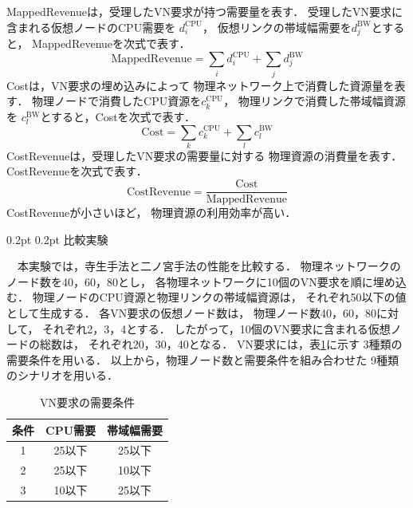 \documentclass[10pt,twocolumn]{jarticle}
\makeatletter
\renewcommand{\section}{\@startsection{section}{1}{\z@}%
{0.2pt}
{0.2pt}
  {\reset@font\Large\mcfamily}}
\makeatother
\begin{document}
MappedRevenueは，受理したVN要求が持つ需要量を表す．
受理したVN要求に含まれる仮想ノードのCPU需要を
$d^{\mathrm{CPU}}_i$，
仮想リンクの帯域幅需要を$d^{\mathrm{BW}}_j$とすると，
MappedRevenueを次式で表す．
\begin{equation}
  \mathrm{MappedRevenue}
  =
  \sum_i d_i^{\mathrm{CPU}}
  +
  \sum_j d_j^{\mathrm{BW}}
  \label{eq:mapped-revenue}
\end{equation}
Costは，VN要求の埋め込みによって
物理ネットワーク上で消費した資源量を表す．
物理ノードで消費したCPU資源を$c^{\mathrm{CPU}}_k$，
物理リンクで消費した帯域幅資源を
$c^{\mathrm{BW}}_l$とすると，Costを次式で表す．
\begin{equation}
  \mathrm{Cost}
  =
  \sum_k c_k^{\mathrm{CPU}}
  +
  \sum_l c_l^{\mathrm{BW}}
  \label{eq:cost}
\end{equation}
CostRevenueは，受理したVN要求の需要量に対する
物理資源の消費量を表す．
CostRevenueを次式で表す．
\begin{equation}
  \mathrm{CostRevenue}
  =
  \frac{\mathrm{Cost}}
       {\mathrm{MappedRevenue}}
  \label{eq:cost-revenue}
\end{equation}
CostRevenueが小さいほど，
物理資源の利用効率が高い．


\section{比較実験}

\noindent　本実験では，寺生手法と二ノ宮手法の性能を比較する．
物理ネットワークのノード数を40，60，80とし，
各物理ネットワークに10個のVN要求を順に埋め込む．
物理ノードのCPU資源と物理リンクの帯域幅資源は，
それぞれ50以下の値として生成する．
各VN要求の仮想ノード数は，
物理ノード数40，60，80に対して，
それぞれ2，3，4とする．
したがって，10個のVN要求に含まれる仮想ノードの総数は，
それぞれ20，30，40となる．
VN要求には，表\ref{tab:demand-condition}に示す
3種類の需要条件を用いる．
以上から，物理ノード数と需要条件を組み合わせた
9種類のシナリオを用いる．

\begin{table}[tb]
  \centering
  \caption{VN要求の需要条件}
  \label{tab:demand-condition}
  \begin{tabular}{c|c|c}
    \hline
    条件 & CPU需要 & 帯域幅需要 \\
    \hline
    1 & 25以下 & 25以下 \\
    2 & 25以下 & 10以下 \\
    3 & 10以下 & 25以下 \\
    \hline
  \end{tabular}
\end{table}
\end{document}
